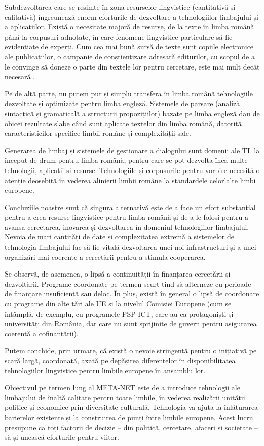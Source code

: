 \begin{multicols}{2}
Subdezvoltarea care se resimte în zona resurselor lingvistice (cantitativă și calitativă) îngreunează enorm eforturile de dezvoltare a tehnologiilor limbajului și a aplicațiilor. Există o necesitate majoră de resurse, de la texte în limba română până la corpusuri adnotate, în care fenomene lingvistice particulare să fie evidențiate de experți. Cum cea mai bună sursă de texte sunt copiile electronice ale publicațiilor, o campanie de conștientizare adresată editurilor, cu scopul de a le convinge să doneze o parte din textele lor pentru cercetare, este mai mult decât necesară \cite{cristea4}.

Pe de altă parte, nu putem pur și simplu transfera în limba română tehnologiile dezvoltate și optimizate pentru limba engleză. Sistemele de parsare (analiză sintactică și gramaticală a structurii propozițiilor) bazate pe limba engleză dau de obicei rezultate slabe când sunt aplicate textelor din limba română, datorită caracteristicilor specifice limbii române și complexității sale.

Generarea de limbaj și sistemele de gestionare a dialogului sunt domenii ale TL la început de drum pentru limba română, pentru care se pot dezvolta încă multe tehnologii, aplicații și resurse. Tehnologiile și corpusurile pentru vorbire necesită o atenție deosebită în vederea alinierii limbii române la standardele celorlalte limbi europene.

Concluziile noastre sunt că singura alternativă este de a face un efort substanțial pentru a crea resurse lingvistice pentru limba română și de a le folosi pentru a avansa cercetarea, inovarea și dezvoltarea în domeniul tehnologiilor limbajului. Nevoia de mari cantități de date și complexitatea extremă a sistemelor de tehnologia limbajului fac să fie vitală dezvoltarea unei noi infrastructuri și a unei organizări mai coerente a cercetării pentru a stimula cooperarea.

Se observă, de asemenea, o lipsă a continuității în finanțarea cercetării și dezvoltării. Programe coordonate pe termen scurt tind să alterneze cu perioade de finanțare insuficientă sau deloc. În plus, există în general o lipsă de coordonare cu programe din alte țări ale UE și la nivelul Comisiei Europene (cum se întâmplă, de exemplu, cu programele PSP-ICT, care au ca protagoniști și universități din România, dar care nu sunt sprijinite de guvern pentru asigurarea coerentă a cofinanțării).

Putem conchide, prin urmare, că există o nevoie stringentă pentru o inițiativă pe scară largă, coordonată, axată pe depășirea diferențelor în disponibilitatea tehnologiilor lingvistice pentru limbile europene în ansamblu lor.

Obiectivul pe termen lung al META-NET este de a introduce tehnologii ale limbajului de înaltă calitate pentru toate limbile, în vederea realizării unității politice și economice prin diversitate culturală. Tehnologia va ajuta la înlăturarea barierelor existente și la construirea de punți între limbile europene. Acest lucru presupune ca toți factorii de decizie -- din politică, cercetare, afaceri și societate -- să-și unească eforturile pentru viitor.

\end{multicols}

